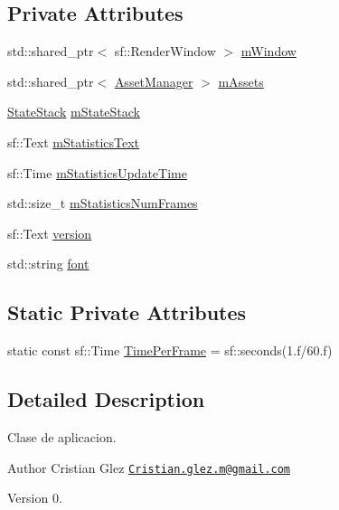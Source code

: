 \subsection*{Private Attributes}
\begin{DoxyCompactItemize}
\item 
std\+::shared\+\_\+ptr$<$ sf\+::\+Render\+Window $>$ \hyperlink{classant_1_1_application_a6050fab136705ac705b727da336bb586}{m\+Window}
\item 
std\+::shared\+\_\+ptr$<$ \hyperlink{classant_1_1_asset_manager}{Asset\+Manager} $>$ \hyperlink{classant_1_1_application_a8a884f6f63b2ed9928543ce493e3bc2c}{m\+Assets}
\item 
\hyperlink{classant_1_1_state_stack}{State\+Stack} \hyperlink{classant_1_1_application_affce09adbc792733866c8a45d7d9bda8}{m\+State\+Stack}
\item 
sf\+::\+Text \hyperlink{classant_1_1_application_ac6efeaf0017a5847c404d569134bdb17}{m\+Statistics\+Text}
\item 
sf\+::\+Time \hyperlink{classant_1_1_application_a85a5669b50f423d557deab7c0315a0f7}{m\+Statistics\+Update\+Time}
\item 
std\+::size\+\_\+t \hyperlink{classant_1_1_application_aaba4dc5709cab5ea4e77b27e5f5fb9e4}{m\+Statistics\+Num\+Frames}
\item 
sf\+::\+Text \hyperlink{classant_1_1_application_a1d16f830e0f443b71d7c654681857e0d}{version}
\item 
std\+::string \hyperlink{classant_1_1_application_a0d20386c229838fe386929ddd5fbd678}{font}
\end{DoxyCompactItemize}
\subsection*{Static Private Attributes}
\begin{DoxyCompactItemize}
\item 
static const sf\+::\+Time \hyperlink{classant_1_1_application_a4b9bf663914a5195a2b4a699c81efd22}{Time\+Per\+Frame} = sf\+::seconds(1.f/60.f)
\end{DoxyCompactItemize}


\subsection{Detailed Description}
Clase de aplicacion. 

\begin{DoxyAuthor}{Author}
Cristian Glez \href{mailto:Cristian.glez.m@gmail.com}{\tt Cristian.\+glez.\+m@gmail.\+com} 
\end{DoxyAuthor}
\begin{DoxyVersion}{Version}
0. 
\end{DoxyVersion}


